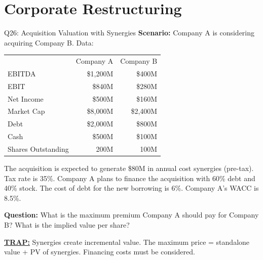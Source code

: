 \documentclass{beamer}
\renewcommand{\scriptsize}{\fontsize{6pt}{7pt}\selectfont}
\begin{document}
	\section{Corporate Restructuring}
	
	\begin{frame}{Q26: Acquisition Valuation with Synergies}
		\scriptsize
		\textbf{Scenario:} Company A is considering acquiring Company B. Data:
		
		\begin{tabular}{lrr}
			& Company A & Company B \\
			EBITDA & \$1,200M & \$400M \\
			EBIT & \$840M & \$280M \\
			Net Income & \$500M & \$160M \\
			Market Cap & \$8,000M & \$2,400M \\
			Debt & \$2,000M & \$800M \\
			Cash & \$500M & \$100M \\
			Shares Outstanding & 200M & 100M \\
		\end{tabular}
		
		The acquisition is expected to generate \$80M in annual cost synergies (pre-tax). Tax rate is 35\%. Company A plans to finance the acquisition with 60\% debt and 40\% stock. The cost of debt for the new borrowing is 6\%. Company A's WACC is 8.5\%.
		
		\textbf{Question:} What is the maximum premium Company A should pay for Company B? What is the implied value per share?
		
		\vspace{2pt}
		\underline{\textbf{TRAP:}} Synergies create incremental value. The maximum price = standalone value + PV of synergies. Financing costs must be considered.
	\end{frame}
	
\end{document}
